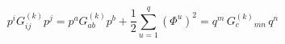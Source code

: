 \begin{equation}
\label{mapping} p^iG^{(k)}_{ij}p^j= p^aG^{(k)}_{ab}p^b+\frac{1}{2}\sum_{u=1}^q
(\Phi^u)^2=q^m \, G_c^{(k)}{}_{mn}\, q^n
\end{equation} 
